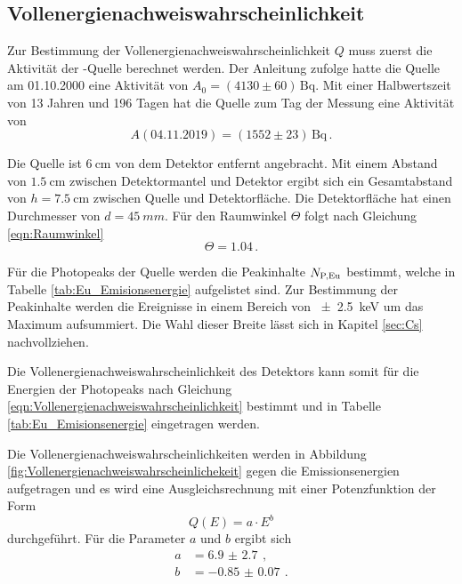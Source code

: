 \subsection{Vollenergienachweiswahrscheinlichkeit}

Zur Bestimmung der Vollenergienachweiswahrscheinlichkeit $Q$ muss zuerst die Aktivität der -Quelle berechnet werden.
Der Anleitung zufolge hatte die Quelle am 01.10.2000 eine Aktivität von $A_\text{0} = (4130 \pm 60)\,\si{\becquerel}$.
Mit einer Halbwertszeit von 13 Jahren und 196 Tagen hat die Quelle zum Tag der Messung eine Aktivität von
\begin{equation*}
  A(04.11.2019) = (1552 \pm 23)\,\si{\becquerel}\,.
\end{equation*}

Die Quelle ist $\SI{6}{\centi\meter}$ von dem Detektor entfernt angebracht. Mit einem Abstand von $\SI{1.5}{\centi\meter}$ zwischen Detektormantel und Detektor ergibt sich ein Gesamtabstand von $h = \SI{7.5}{\centi\meter}$ zwischen Quelle und Detektorfläche.
Die Detektorfläche hat einen Durchmesser von $d = \SI{45}{mm}$.
Für den Raumwinkel $\Theta$ folgt nach Gleichung \eqref{eqn:Raumwinkel}
\begin{equation*}
   \Theta = \num{1.04} \, .
\end{equation*}

Für die Photopeaks der  Quelle werden die Peakinhalte $N_\text{P,\ce{Eu}}$ bestimmt, welche in Tabelle \ref{tab:Eu_Emisionsenergie} aufgelistet sind.
Zur Bestimmung der Peakinhalte werden die Ereignisse in einem Bereich von \SI{\pm2.5}{\kilo\electronvolt} um das Maximum aufsummiert. Die Wahl dieser Breite lässt sich in Kapitel \ref{sec:Cs} nachvollziehen.

Die Vollenergienachweiswahrscheinlichkeit des Detektors kann somit für die Energien der Photopeaks nach Gleichung \eqref{eqn:Vollenergienachweiswahrscheinlichkeit} bestimmt und in Tabelle \ref{tab:Eu_Emisionsenergie} eingetragen werden.

Die Vollenergienachweiswahrscheinlichkeiten werden in Abbildung \ref{fig:Vollenergienachweiswahrscheinlichekeit} gegen die Emissionsenergien aufgetragen und es wird eine Ausgleichsrechnung mit einer Potenzfunktion der Form
\begin{equation}
  Q(E) = a \cdot E^b
  \label{eqn:Eff}
\end{equation}
durchgeführt.
Für die Parameter $a$ und $b$ ergibt sich
\begin{align*}
   a &=  \SI{6.9(27)}{}\, ,\\
   b &=  \SI{-0.85(7)}{}\, .\\
\end{align*}

